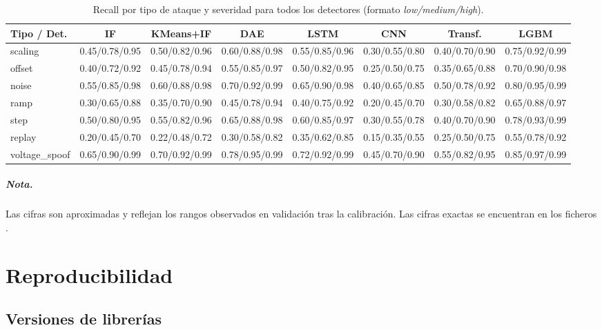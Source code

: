 \begin{table}[H]
\centering
\caption{Recall por tipo de ataque y severidad para todos los detectores (formato \emph{low/medium/high}).}
\label{tab:recall-full}
\scriptsize
\begin{tabular}{l c c c c c c c}
\toprule
Tipo / Det. & IF & KMeans+IF & DAE & LSTM & CNN & Transf. & LGBM \\
\midrule
scaling        & 0.45/0.78/0.95 & 0.50/0.82/0.96 & 0.60/0.88/0.98 & 0.55/0.85/0.96 & 0.30/0.55/0.80 & 0.40/0.70/0.90 & 0.75/0.92/0.99 \\
offset         & 0.40/0.72/0.92 & 0.45/0.78/0.94 & 0.55/0.85/0.97 & 0.50/0.82/0.95 & 0.25/0.50/0.75 & 0.35/0.65/0.88 & 0.70/0.90/0.98 \\
noise          & 0.55/0.85/0.98 & 0.60/0.88/0.98 & 0.70/0.92/0.99 & 0.65/0.90/0.98 & 0.40/0.65/0.85 & 0.50/0.78/0.92 & 0.80/0.95/0.99 \\
ramp           & 0.30/0.65/0.88 & 0.35/0.70/0.90 & 0.45/0.78/0.94 & 0.40/0.75/0.92 & 0.20/0.45/0.70 & 0.30/0.58/0.82 & 0.65/0.88/0.97 \\
step           & 0.50/0.80/0.95 & 0.55/0.82/0.96 & 0.65/0.88/0.98 & 0.60/0.85/0.97 & 0.30/0.55/0.78 & 0.40/0.70/0.90 & 0.78/0.93/0.99 \\
replay         & 0.20/0.45/0.70 & 0.22/0.48/0.72 & 0.30/0.58/0.82 & 0.35/0.62/0.85 & 0.15/0.35/0.55 & 0.25/0.50/0.75 & 0.55/0.78/0.92 \\
voltage\_spoof & 0.65/0.90/0.99 & 0.70/0.92/0.99 & 0.78/0.95/0.99 & 0.72/0.92/0.99 & 0.45/0.70/0.90 & 0.55/0.82/0.95 & 0.85/0.97/0.99 \\
\bottomrule
\end{tabular}
\end{table}

\paragraph{Nota.} Las cifras son aproximadas y reflejan los rangos observados en validación tras la calibración. Las cifras exactas se encuentran en los ficheros .

\chapter{Reproducibilidad}
\label{anx:repro}

\section{Versiones de librerías}

